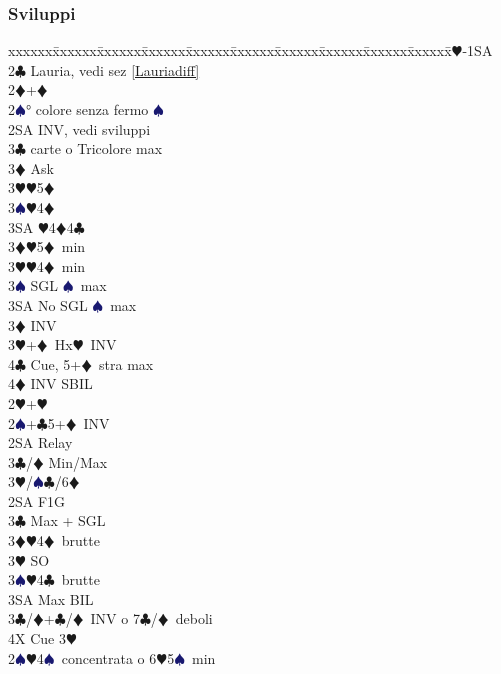 \documentclass[a4paper,italian]{article}
\newcommand{\BC}{\textcolor{OliveGreen}{$\clubsuit$}}
\newcommand{\BD}{\textcolor{RedOrange}{$\vardiamondsuit$}}
\newcommand{\BH}{\textcolor{Red2}{$\varheartsuit${}}}
\newcommand{\BS}{\textcolor{MidnightBlue}{$\spadesuit${}}}
\newenvironment{bidtable}
{\begin{tabbing}

    xxxxxx\=xxxxxx\=xxxxxx\=xxxxxx\=xxxxxx\=xxxxxx\=xxxxxx\=xxxxxx\=xxxxxx\=xxxxxx\=\kill}
{\end{tabbing} }%
\begin{document}
\begin{multicols*}{2}
    \subsubsection{Sviluppi}

    \begin{bidtable}
        1\BH-1SA\\
        2\BC\> Lauria, vedi sez \ref{Lauriadiff}\\
        2\BD {}+\BD \+\\
        2\BS {}° colore senza fermo \BS \\
        2SA \> INV, vedi sviluppi\+\\
        3\BC {} carte o Tricolore max\+\\
        3\BD \> Ask\+\\
        3\BH {}\BH 5\BD \\
        3\BS {}\BH 4\BD \\
        3SA \BH 4\BD 4\BC \-\-\\
        3\BD {}\BH 5\BD\ min\\
        3\BH {}\BH 4\BD\ min\\
        3\BS \> SGL \BS\ max\\
        3SA \> No SGL \BS\ max\-\\
        3\BD \> INV\\
        3\BH {}+\BD\ Hx\BH\ INV\\
        4\BC \> Cue, 5+\BD\ stra max \\
        4\BD \> INV SBIL\-\\
        2\BH {}+\BH \+\\
        2\BS {}+\BC 5+\BD\ INV\+\\
        2SA \> Relay\+\\
        3\BC/\BD \> Min/Max\\
        3\BH/\BS {}\BC /6\BD \-\-\\
        2SA \> F1G\+\\
        3\BC \> Max + SGL\\
        3\BD {}\BH4\BD\ brutte\\
        3\BH \> SO\\
        3\BS {}\BH4\BC\ brutte\\
        3SA \> Max BIL\-\\
        3\BC/\BD {}+\BC/\BD\ INV o 7\BC/\BD\ deboli\\
        4X \> Cue 3\BH \-\\
        2\BS {}\BH 4\BS\ concentrata o 6\BH 5\BS\ min\+\\

\end{bidtable}
\end{multicols*}
\end{document}
